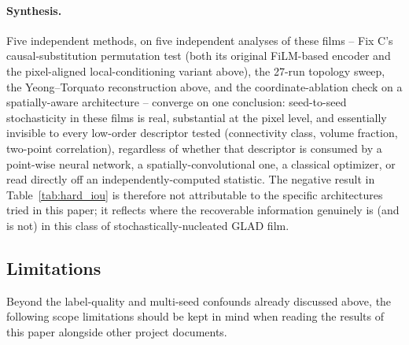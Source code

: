 \documentclass[aip,amsmath,amssymb,reprint]{revtex4-1}
\begin{document}
\paragraph{Synthesis.} Five independent methods, on five independent analyses
of these films -- Fix C's causal-substitution permutation test (both its
original FiLM-based encoder and the pixel-aligned local-conditioning variant
above), the 27-run topology sweep, the Yeong--Torquato reconstruction above,
and the coordinate-ablation check on a spatially-aware architecture --
converge on one conclusion: seed-to-seed stochasticity in these films is real,
substantial at the pixel level, and essentially invisible to every low-order
descriptor tested (connectivity class, volume fraction, two-point
correlation), regardless of whether that descriptor is consumed by a
point-wise neural network, a spatially-convolutional one, a classical
optimizer, or read directly off an independently-computed statistic. The
negative result in Table~\ref{tab:hard_iou} is therefore not attributable to
the specific architectures tried in this paper; it reflects where the
recoverable information genuinely is (and is not) in this class of
stochastically-nucleated GLAD film.

\subsection{Limitations}
\label{ssec:disc_limits}

Beyond the label-quality and multi-seed confounds already
discussed above, the following scope limitations should be kept
in mind when reading the results of this paper alongside other
project documents.
\end{document}
